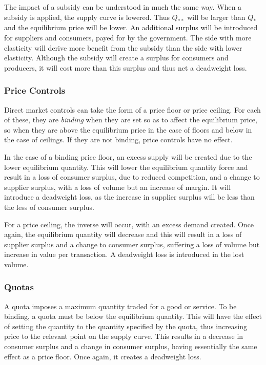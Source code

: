 \documentclass[12pt]{report}
\begin{document}
\bigskip
The impact of a subsidy can be understood in much the same way. When a subsidy 
is applied, the supply curve is lowered. Thus \(Q_{**}\) will be larger than \(Q_*\)
and the equilibrium price will be lower. An additional surplus will be introduced
for suppliers and consumers, payed for by the government. The side with more 
elasticity will derive more benefit from the subsidy than the side with lower elasticity.
Although the subsidy will create a surplus for consumers and producers, it will
cost more than this surplus and thus net a deadweight loss.

\subsubsection*{Price Controls}
Direct market controls can take the form of a price floor or price ceiling.
For each of these, they are \textit{binding} when they are set so as to affect
the equilibrium price, so when they are above the equilibrium price in the case
of floors and below in the case of ceilings. If they are not binding, price
controls have no effect.

\bigskip
In the case of a binding price floor, an excess supply will be created due
to the lower equilibrium quantity. This will lower the equilibrium quantity force
and result in a loss of consumer surplus, due to reduced competition, and a change
to supplier surplus, with a loss of volume but an increase of margin. It will
introduce a deadweight loss, as the increase in supplier surplus will be less
than the less of consumer surplus.

\bigskip
For a price ceiling, the inverse will occur, with an excess demand created.
Once again, the equilibrium quantity will decrease and this will result in
a loss of supplier surplus and a change to consumer surplus, suffering a
loss of volume but increase in value per transaction. A deadweight loss is
introduced in the lost volume.

\subsubsection*{Quotas}
A quota imposes a maximum quantity traded for a good or service. To be 
binding, a quota must be below the equilibrium quantity. This will have the
effect of setting the quantity to the quantity specified by the quota,
thus increasing price to the relevant point on the supply curve. This
results in a decrease in consumer surplus and a change in consumer surplus,
having essentially the same effect as a price floor. Once again, it creates
a deadweight loss.
\end{document}
